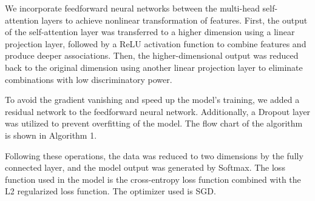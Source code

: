 \documentclass[a4paper]{cas-dc}
\begin{document}
We incorporate feedforward neural networks between the multi-head self-attention layers to achieve nonlinear transformation of features. First, the output of the self-attention layer was transferred to a higher dimension using a linear projection layer, followed by a ReLU activation function to combine features and produce deeper associations. Then, the higher-dimensional output was reduced back to the original dimension using another linear projection layer to eliminate combinations with low discriminatory power.

To avoid the gradient vanishing and speed up the model's training, we added a residual network to the feedforward neural network. Additionally, a Dropout layer was utilized to prevent overfitting of the model. The flow chart of the algorithm is shown in Algorithm 1.

Following these operations, the data was reduced to two dimensions by the fully connected layer, and the model output was generated by Softmax. The loss function used in the model is the cross-entropy loss function combined with the L2 regularized loss function. The optimizer used is SGD.
\end{document}
